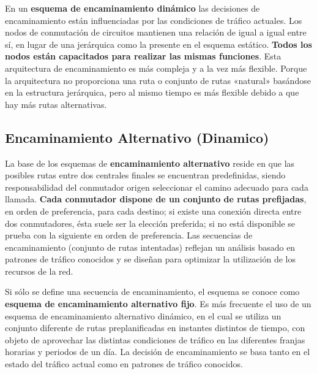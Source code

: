 En un \textbf{esquema de encaminamiento dinámico} las decisiones de encaminamiento están influenciadas por las condiciones de tráfico actuales. Los nodos de conmutación de circuitos mantienen una relación de igual a igual entre sí, en lugar de una jerárquica como la presente en el esquema estático. \textbf{Todos los nodos están capacitados para realizar las mismas funciones}. Esta arquitectura de encaminamiento es más compleja y a la vez más flexible. Porque la arquitectura no proporciona una ruta o conjunto de rutas «natural» basándose en la estructura jerárquica, pero al mismo tiempo es más flexible debido a que hay más rutas alternativas.

\subsection{Encaminamiento Alternativo (Dinamico)}

La base de los esquemas de \textbf{encaminamiento alternativo} reside en que las posibles rutas entre dos centrales finales se encuentran predefinidas, siendo responsabilidad del conmutador origen seleccionar el camino adecuado para cada llamada. \textbf{Cada conmutador dispone de un conjunto de rutas prefijadas}, en orden de preferencia, para cada destino; si existe una conexión directa entre dos conmutadores, ésta suele ser la elección preferida; si no está disponible se prueba con la siguiente en orden de preferencia. Las secuencias de encaminamiento (conjunto de rutas intentadas) reflejan un análisis basado en patrones de tráfico conocidos y se diseñan para optimizar la utilización de los recursos de la red.

Si sólo se define una secuencia de encaminamiento, el esquema se conoce como \textbf{esquema de encaminamiento alternativo fijo}. Es más frecuente el uso de un esquema de encaminamiento alternativo dinámico, en el cual se utiliza un conjunto diferente de rutas preplanificadas en instantes distintos de tiempo, con objeto de aprovechar las distintas condiciones de tráfico en las diferentes franjas horarias y periodos de un día. La decisión de encaminamiento se basa tanto en el estado del tráfico actual como en patrones de tráfico conocidos.